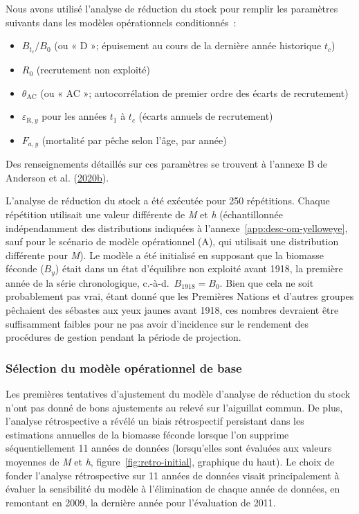 \documentclass[11pt]{book}
\begin{document}
Nous avons utilisé l'analyse de réduction du stock pour remplir les paramètres suivants dans les modèles opérationnels conditionnés~:
\begin{itemize}

\item
  \(B_{t_c}/B_0\) (ou « D »; épuisement au cours de la dernière année historique \(t_c\))
\item
  \(R_0\) (recrutement non exploité)
\item
  \(\theta_\textrm{AC}\) (ou « AC »; autocorrélation de premier ordre des écarts de recrutement)
\item
  \(\varepsilon_{\textrm{R},y}\) pour les années \(t_1\) à \(t_c\) (écarts annuels de recrutement)
\item
  \(F_{a,y}\) (mortalité par pêche selon l'âge, par année)
\end{itemize}
Des renseignements détaillés sur ces paramètres se trouvent à l'annexe B de Anderson et al. (\protect\hyperlink{ref-anderson2020gfmp}{2020}\protect\hyperlink{ref-anderson2020gfmp}{b}).

L'analyse de réduction du stock a été exécutée pour 250 répétitions. Chaque répétition utilisait une valeur différente de \emph{M} et \emph{h} (échantillonnée indépendamment des distributions indiquées à l'annexe~\ref{app:desc-om-yelloweye}, sauf pour le scénario de modèle opérationnel (A), qui utilisait une distribution différente pour \emph{M}). Le modèle a été initialisé en supposant que la biomasse féconde (\(B_y\)) était dans un état d'équilibre non exploité avant 1918, la première année de la série chronologique, c.-à-d.~\(B_{1918} = B_0\). Bien que cela ne soit probablement pas vrai, étant donné que les Premières Nations et d'autres groupes pêchaient des sébastes aux yeux jaunes avant 1918, ces nombres devraient être suffisamment faibles pour ne pas avoir d'incidence sur le rendement des procédures de gestion pendant la période de projection.

\hypertarget{sec:approach3-conditioning-base-om}{%
\subsubsection{Sélection du modèle opérationnel de base}\label{sec:approach3-conditioning-base-om}}

Les premières tentatives d'ajustement du modèle d'analyse de réduction du stock n'ont pas donné de bons ajustements au relevé sur l'aiguillat commun. De plus, l'analyse rétrospective a révélé un biais rétrospectif persistant dans les estimations annuelles de la biomasse féconde lorsque l'on supprime séquentiellement 11 années de données (lorsqu'elles sont évaluées aux valeurs moyennes de \emph{M} et \emph{h}, figure~\ref{fig:retro-initial}, graphique du haut). Le choix de fonder l'analyse rétrospective sur 11 années de données visait principalement à évaluer la sensibilité du modèle à l'élimination de chaque année de données, en remontant en 2009, la dernière année pour l'évaluation de 2011.
\end{document}
